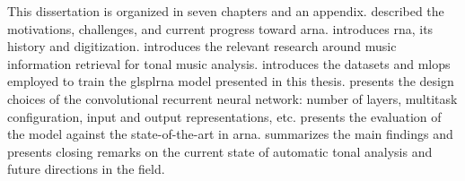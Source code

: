 
This dissertation is organized in seven chapters and an
appendix.  described the motivations,
challenges, and current progress toward \gls{arna}.
 introduces
\gls{rna}, its history and digitization.
 introduces the relevant research around
music information retrieval for tonal music analysis.
 introduces the
datasets and \gls{mlops} employed to train the glspl{rna}
model presented in this thesis. 
presents the design choices of the convolutional recurrent
neural network: number of layers, multitask configuration,
input and output representations, etc.
 presents the evaluation of
the model against the state-of-the-art in \gls{arna}.
 summarizes the main findings and
presents closing remarks on the current state of automatic
tonal analysis and future directions in the field.
